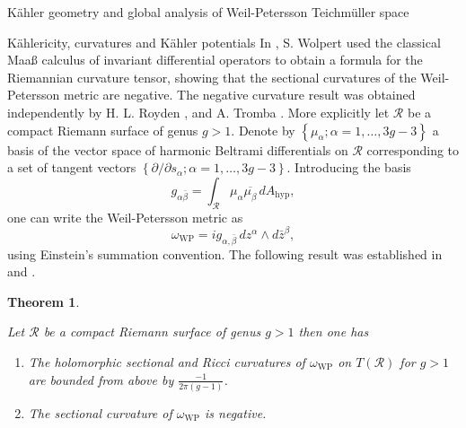 \documentclass[12pt]{amsart}
\theoremstyle{plain}
\newtheorem{theorem}{Theorem}[section]
\theoremstyle{definition}
\theoremstyle{remark}
\numberwithin{equation}{section} %
\numberwithin{figure}{section} %
\begin{document}
\begin{section}{K\"ahler geometry and global analysis of Weil-Petersson Teichm\"uller space}
\begin{subsection}{K\"ahlericity, curvatures and K\"ahler potentials}
 In \cite{Wolpert}, S. Wolpert used the classical Maa{\ss} calculus of invariant differential operators to obtain a formula for the Riemannian curvature tensor, showing that the sectional curvatures of the Weil-Petersson metric are negative. The negative curvature result was obtained independently by H. L. Royden \cite{Royden1}, \cite{Royden2} and A. Tromba \cite{Tromba}.
 More explicitly let \(\mathscr{R}\) be a compact Riemann
surface of genus \(g>1\). Denote by \(\left\{\mu_{\alpha} ; \alpha=1, \ldots, 3 g-3\right\}\) a basis of the vector space of harmonic Beltrami differentials on \(\mathscr{R}\) corresponding to a set of tangent
vectors \(\left\{\partial / \partial s_{\alpha} ; \alpha=1, \ldots, 3 g-3\right\}\). Introducing the basis
\begin{equation}
    g_{\alpha \bar{\beta}}=\int_{\mathscr{R}} \mu_{\alpha} \overline{\mu_{\beta}}\, dA_{\mathrm{hyp}},
\end{equation} 
one can write the Weil-Petersson metric as
$$
\omega_{\mathrm{WP}}=i g_{\alpha, \bar{\beta}}\, d z^{\alpha} \wedge d \bar{z}^{{\beta}},
$$
using Einstein's summation convention. The following result was established in \cite{Wolpert} and \cite{Tromba}.

\begin{theorem}\label{thm_wolpert-tromba}

Let $\mathscr{R}$ be a compact Riemann surface of genus $g>1$ then one has

\begin{enumerate}[font=\upshape]

\item The holomorphic sectional and Ricci curvatures of $\omega_{\mathrm{WP}}$ on $T(\mathscr{R})$ for $g>1$
are bounded from above by $\frac{-1}{2 \pi(g-1)}$.

\item The sectional curvature of $\omega_{\mathrm{WP}}$ is negative.


\end{enumerate}
\end{theorem}
\end{subsection}
\end{section}
\end{document}
